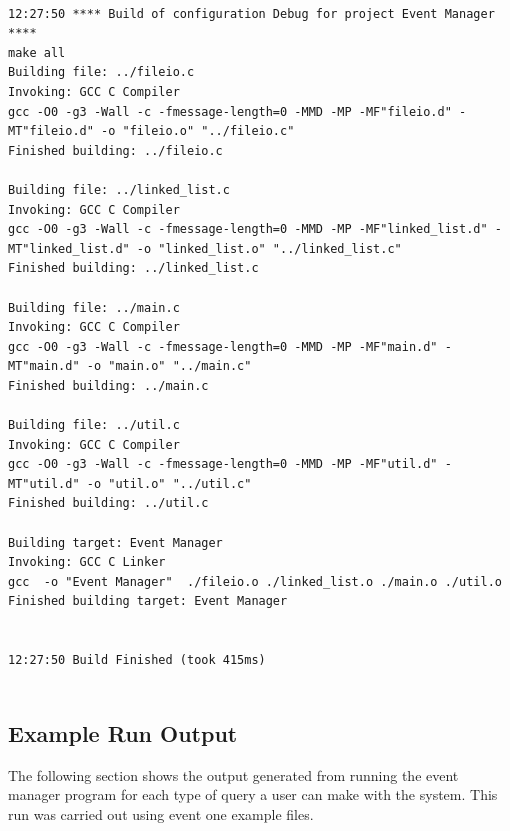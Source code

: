 \documentclass{article}
\begin{document}
\begin{center}
	\begin{lstlisting}[showstringspaces=false, caption={Build log of the C Event Manager Program}]
	
12:27:50 **** Build of configuration Debug for project Event Manager ****
make all 
Building file: ../fileio.c
Invoking: GCC C Compiler
gcc -O0 -g3 -Wall -c -fmessage-length=0 -MMD -MP -MF"fileio.d" -MT"fileio.d" -o "fileio.o" "../fileio.c"
Finished building: ../fileio.c
 
Building file: ../linked_list.c
Invoking: GCC C Compiler
gcc -O0 -g3 -Wall -c -fmessage-length=0 -MMD -MP -MF"linked_list.d" -MT"linked_list.d" -o "linked_list.o" "../linked_list.c"
Finished building: ../linked_list.c
 
Building file: ../main.c
Invoking: GCC C Compiler
gcc -O0 -g3 -Wall -c -fmessage-length=0 -MMD -MP -MF"main.d" -MT"main.d" -o "main.o" "../main.c"
Finished building: ../main.c
 
Building file: ../util.c
Invoking: GCC C Compiler
gcc -O0 -g3 -Wall -c -fmessage-length=0 -MMD -MP -MF"util.d" -MT"util.d" -o "util.o" "../util.c"
Finished building: ../util.c
 
Building target: Event Manager
Invoking: GCC C Linker
gcc  -o "Event Manager"  ./fileio.o ./linked_list.o ./main.o ./util.o   
Finished building target: Event Manager
 

12:27:50 Build Finished (took 415ms)
		
	\end{lstlisting}
\end{center}

\subsection{Example Run Output}
The following section shows the output generated from running the event manager program for each type of query a user can make with the system. This run was carried out using event one example files.
\end{document}
